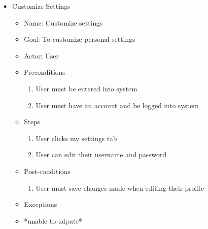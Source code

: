 \begin{itemize}
\item Customize Settings
	\begin{itemize}
	\item Name: Customize settings
    \item Goal: To customize personal settings
    \item Actor: User
    \item Preconditions
		\begin{enumerate}
		\item User must be entered into system
        \item User must have an account and be logged into system
        \end{enumerate}
    \item Steps
    	\begin{enumerate}
		\item User clicks my settings tab
        \item User can edit their username and password
        \end{enumerate}
    \item Post-conditions
    	\begin{enumerate}
		\item User must save changes made when editing their profile
        \end{enumerate}
    \item Exceptions
    	\item *unable to udpate*
    \end{itemize}
    

\end{itemize}
